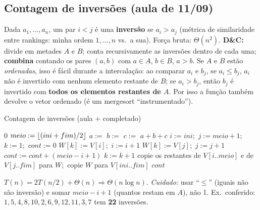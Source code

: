 \subsection{Contagem de inversões (aula de 11/09)}
Dada $a_1,\dots,a_n$, um par $i<j$ é uma \textbf{inversão} se $a_i>a_j$ (métrica de similaridade entre rankings: minha ordem $1,\dots,n$ vs.\ a sua). Força bruta: $\Theta(n^2)$.
\textbf{D\&C:} divide em metades $A$ e $B$; conta recursivamente as inversões dentro de cada uma; \textbf{combina} contando os pares $(a,b)$ com $a\in A$, $b\in B$, $a>b$. Se $A$ e $B$ estão \emph{ordenadas}, isso é fácil durante a intercalação: ao comparar $a_i$ e $b_j$, se $a_i\le b_j$, $a_i$ não é invertido com nenhum elemento restante de $B$; se $a_i>b_j$, então $b_j$ é invertido com \textbf{todos os elementos restantes de $A$}. Por isso a função também devolve o vetor ordenado (é um mergesort ``instrumentado'').
\begin{pseudo}{Contagem de inversões (aula + completado)}
\begin{algorithmic}
 
   \State \Return $0$ \EndIf
  \State $meio:=\lfloor(ini+fim)/2\rfloor$
  \State $a:=$ 
  \State $b:=$ 
  \State $c:=$ 
  \State \Return $a+b+c$
\EndFunction
{}
  \State $i:=ini$;\ $j:=meio+1$;\ $k:=1$;\ $cont:=0$
     \State $W[k]:=V[i]$;\ $i:=i+1$
    \Else
      \State $W[k]:=V[j]$;\ $j:=j+1$
      \State $cont:=cont+(meio-i+1)$ 
    \EndIf
    \State $k:=k+1$
  \EndWhile
  \State copie os restantes de $V[i..meio]$ e de $V[j..fim]$ para $W$;\ copie $W$ para $V[ini..fim]$
  \State \Return $cont$
\EndFunction
\end{algorithmic}
\end{pseudo}
$T(n)=2T(n/2)+\Theta(n)\Rightarrow\Theta(n\log n)$. \emph{Cuidado:} usar ``$\le$'' (iguais não são inversão) e somar $meio-i+1$ (quantos restam em $A$), não 1. Ex.\ conferido: $1,5,4,8,10,2,6,9,12,11,3,7$ tem \textbf{22} inversões.

